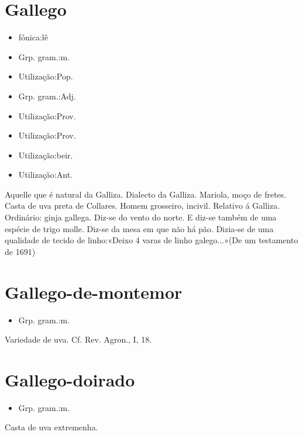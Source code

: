 \section{Gallego}
\begin{itemize}
\item {fónica:lê}
\end{itemize}
\begin{itemize}
\item {Grp. gram.:m.}
\end{itemize}
\begin{itemize}
\item {Utilização:Pop.}
\end{itemize}
\begin{itemize}
\item {Grp. gram.:Adj.}
\end{itemize}
\begin{itemize}
\item {Utilização:Prov.}
\end{itemize}
\begin{itemize}
\item {Utilização:Prov.}
\end{itemize}
\begin{itemize}
\item {Utilização:beir.}
\end{itemize}
\begin{itemize}
\item {Utilização:Ant.}
\end{itemize}
Aquelle que é natural da Galliza.
Dialecto da Galliza.
Mariola, moço de fretes.
Casta de uva preta de Collares.
Homem grosseiro, incivil.
Relativo á Galliza.
Ordinário: \textunderscore ginja gallega\textunderscore .
Diz-se do vento do norte.
E diz-se também de uma espécie de trigo molle.
Diz-se da mesa em que não há pão.
Dizia-se de uma qualidade de tecido de linho:«\textunderscore Deixo 4 varas de linho galego...\textunderscore »(De um testamento de 1691)
\section{Gallego-de-montemor}
\begin{itemize}
\item {Grp. gram.:m.}
\end{itemize}
Variedade de uva. Cf. \textunderscore Rev. Agron.\textunderscore , I, 18.
\section{Gallego-doirado}
\begin{itemize}
\item {Grp. gram.:m.}
\end{itemize}
Casta de uva extremenha.
